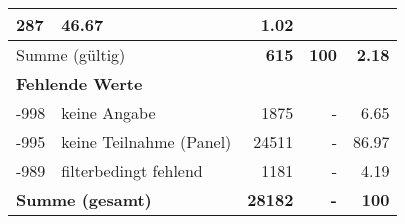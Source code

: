 \begin{longtable}{lXrrr}
       \num{287} &
       \num[round-mode=places,round-precision=2]{46.67} &
         \num[round-mode=places,round-precision=2]{1.02} \\
     \midrule
     \multicolumn{2}{l}{Summe (gültig)} &
       \textbf{\num{615}} &
     \textbf{100} &
       \textbf{\num[round-mode=places,round-precision=2]{2.18}} \\
     \multicolumn{5}{l}{\textbf{Fehlende Werte}}\\
       -998 &
       keine Angabe &
         \num{1875} &
        - &
         \num[round-mode=places,round-precision=2]{6.65} \\
       -995 &
       keine Teilnahme (Panel) &
         \num{24511} &
        - &
         \num[round-mode=places,round-precision=2]{86.97} \\
       -989 &
       filterbedingt fehlend &
         \num{1181} &
        - &
         \num[round-mode=places,round-precision=2]{4.19} \\
     \midrule
     \multicolumn{2}{l}{\textbf{Summe (gesamt)}} &
          \textbf{\num{28182}} &
        \textbf{-} &
        \textbf{100} \\
     \bottomrule
     \end{longtable}
     
